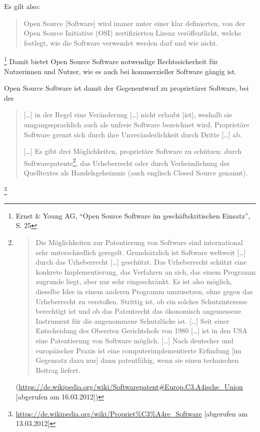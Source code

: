 \documentclass[a4paper]{scrartcl}
\begin{document}
Es gilt also: \begin{quote}Open Source [Software] wird immer unter einer klar
  definierten, von der Open Source Initiative (OSI) zertifizierten Lizenz
  veröffentlicht, welche festlegt, wie die Software verwendet werden darf und
  wie nicht.\end{quote}\footnote{Ernst \& Young AG, ``Open Source Software im
  geschäftskritischen Einsatz'', S. 25} Damit bietet Open Source Software
notwendige Rechtssicherheit für Nutzerinnen und Nutzer, wie es auch bei
kommerzieller Software gängig ist.

Open Source Software ist damit der Gegenentwurf zu proprietärer Software, bei
der

\begin{quotation} [\ldots] in der Regel eine Veränderung [\ldots] nicht erlaubt [ist],
  weshalb sie umgangssprachlich auch als unfreie Software bezeichnet
  wird. Proprietäre Software grenzt sich durch ihre Unveränderlichkeit durch
  Dritte [\ldots] ab.

  [\ldots] Es gibt drei Möglichkeiten, proprietäre Software zu schützen: durch
  Softwarepatente\footnote{\begin{quote}Die Möglichkeiten zur Patentierung von
      Software sind international sehr unterschiedlich geregelt. Grundsätzlich
      ist Software weltweit [\ldots] durch das Urheberrecht [\ldots]
      geschützt. Das Urheberrecht schützt eine konkrete Implementierung, das
      Verfahren an sich, das einem Programm zugrunde liegt, aber nur sehr
      eingeschränkt. Es ist also möglich, dieselbe Idee in einem anderen
      Programm umzusetzen, ohne gegen das Urheberrecht zu verstoßen. Strittig
      ist, ob ein solches Schutzinteresse berechtigt ist und ob das Patentrecht
      das ökonomisch angemessene Instrument für die angenommene Schutzlücke
      ist. [\ldots] Seit einer Entscheidung des Obersten Gerichtshofs von 1980
      [\ldots] ist in den USA eine Patentierung von Software möglich. [\ldots]
      Nach deutscher und europäischer Praxis ist eine computerimplementierte
      Erfindung [im Gegensatz dazu nur] dann patentfähig, wenn sie einen
      technischen Beitrag liefert.\end{quote}
    (\href{https://de.wikipedia.org/wiki/Softwarepatent\#Europ.C3.A4ische_Union}{{https://de.wikipedia.org/wiki/Softwarepatent\#Europ.C3.A4ische\_Union}}
    [abgerufen am 16.03.2012])}, das Urheberrecht oder durch Verheimlichung des
  Quelltextes als Handelsgeheimnis (auch englisch Closed Source
  genannt).\end{quotation}\footnote{\href{https://de.wikipedia.org/wiki/Propriet?re_Software}{{https://de.wikipedia.org/wiki/Propriet\%C3\%A4re\_Software}}
  [abgerufen am 13.03.2012]}
\end{document}
